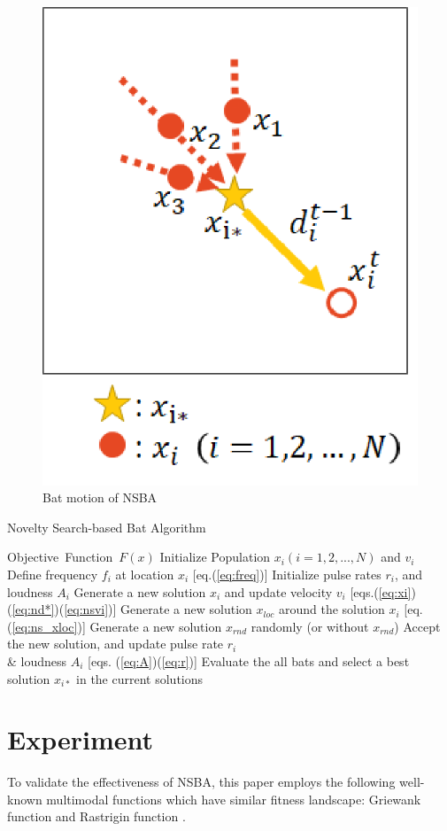 \documentclass{ies2018}
\begin{document}
\begin{figure}[h]
\begin{center}
\includegraphics[width=0.5\linewidth]{eps/nsba.eps}
\end{center}
\caption{Bat motion of NSBA}
\label{fig:sbat}
\end{figure}

\begin{algorithm}[H]
\caption{Novelty Search-based Bat Algorithm}
\label{code:sba}
\begin{algorithmic}[1]
\REQUIRE Objective\ Function\ $F(x)$
\STATE Initialize Population $x_i(i=1,2,..., N)$ and $v_i$\\
\STATE Define frequency $f_i$ at location $x_i$ [eq.(\ref{eq:freq})]
\STATE Initialize pulse rates $r_i$, and loudness $A_i$
\STATE Generate a new solution $x_i$ and update velocity $v_i$  [eqs.(\ref{eq:xi})(\ref{eq:nd*})(\ref{eq:nsvi})] 
\STATE Generate a new solution ${x_{loc}}$ around the solution $x_{i}$ [eq.(\ref{eq:ns_xloc})] 
\ENDIF
\STATE Generate a new solution $x_{rnd}$ randomly (or without ${x_{rnd}}$)
\STATE Accept the new solution, and update pulse rate $r_i$ \\ \& loudness $A_i$ [eqs. (\ref{eq:A})(\ref{eq:r})] 
\ENDIF
\ENDFOR
\STATE Evaluate the all bats and select a best solution $x_{i*}$ in the current solutions
\ENDWHILE
\end{algorithmic}
\end{algorithm}

\section{Experiment}
To validate the effectiveness of NSBA, this paper employs the following well-known multimodal functions which have similar fitness landscape: Griewank function \cite{f1} and Rastrigin function \cite{f2}.
\end{document}
